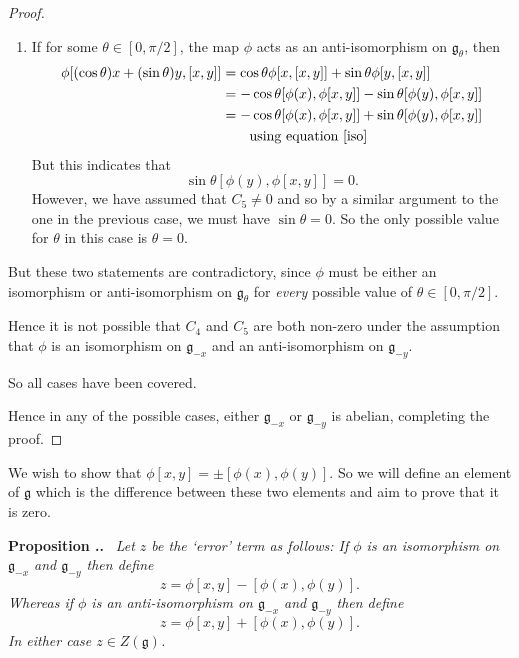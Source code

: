 \documentclass[honours]{UNSWthesis}
\newcommand{\g}{\mathfrak{g}}
\newcommand{\1}{\mathbf{e}_{1}}
\newcommand{\2}{\mathbf{e}_{3}}
\newcommand{\3}{\mathbf{e}_{3}}
\newcounter{Item}[section]
\newenvironment{Proposition}{\medskip
                            \refstepcounter{Item}
                            \noindent
                           {\bf Proposition \thesection.\theItem.}\ %
                            \begingroup \sl}
                           {\endgroup\medskip}
\begin{document}
\begin{proof}
\begin{enumerate}
\begin{enumerate}
\item If for some $\theta \in [0,\pi/2]$, the map $\phi$ acts as an anti-isomorphism on $\g_{\theta}$, then
\begin{align*}
\phi[(\cos{\theta})x + (\sin{\theta})y,[x,y]] 
&= \cos{\theta}\phi[x,[x,y]]+ \sin{\theta}\phi[y,[x,y]] \\
&= -\cos{\theta}[\phi(x),\phi[x,y]]- \sin{\theta}[\phi(y),\phi[x,y]] \\
&= -\cos{\theta}[\phi(x),\phi[x,y]]+ \sin{\theta}[\phi(y),\phi[x,y]]\\ 
& \quad \quad \text{using equation \ref{iso}}
\end{align*}
But this indicates that 
\[
\sin{\theta}[\phi(y),\phi[x,y]]=0.
\]
However, we have assumed that $C_5 \neq 0 $ and 
so by a similar argument to the one in the previous case, we must have $\sin{\theta}=0$. So the only possible value for $\theta$ in this case is $\theta = 0$.
\end{enumerate}

But these two statements are contradictory, since $\phi$ must be either an isomorphism or anti-isomorphism on $\g_{\theta}$ for \emph{every} possible value of $\theta \in [0, \pi/2]$.

Hence it is not possible that $C_4$ and $C_5$ are both non-zero under the assumption that $\phi$ is an isomorphism on $\g_{-x}$ and an anti-isomorphism on $\g_{-y}$. 

So all cases have been covered.

\end{enumerate}
Hence in any of the possible cases, either $\g_{-x}$ or $\g_{-y}$ is abelian, completing the proof. 

\end{proof}


We wish to show that $\phi[x,y]= \pm[\phi(x),\phi(y)]$. So we will define an element of $\g$ which is the difference between these two elements and aim to prove that it is zero.

\begin{Proposition}
 Let $z$ be the `error' term as follows: If $\phi$ is an isomorphism on $\g_{-x}$ and $\g_{-y}$ then define
\[
z = \phi [x,y] -[\phi(x),\phi(y)].
\]
Whereas if $\phi$ is an anti-isomorphism on $\g_{-x}$ and $\g_{-y}$ then define
\[
z = \phi [x,y] +[\phi(x),\phi(y)].
\]
In either case $z \in Z(\g)$.
\end{Proposition}
\end{document}
